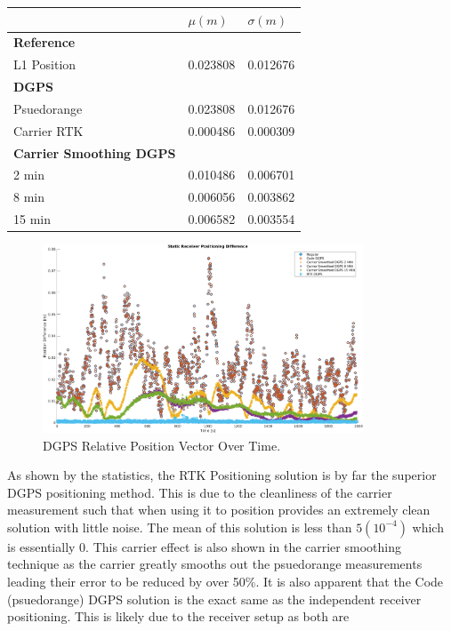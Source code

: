 \documentclass[11pt]{article}
\begin{document}
\begin{enumerate}[label=\textbf{\arabic*.}]
\begin{table}[H]
\begin{tabular}{ P{5cm}|P{3cm} P{3cm} }
         & \boldmath$\mu (m)$ & \boldmath$\sigma (m)$ \\
         \hline
         \textbf{Reference} &  \\
         L1 Position & 0.023808 & 0.012676 \\
         \hline
         \textbf{DGPS} &  \\
         Psuedorange & 0.023808 & 0.012676 \\
         Carrier RTK & 0.000486 & 0.000309 \\
         \hline
         \textbf{Carrier Smoothing DGPS} &  \\
         2 min & 0.010486 & 0.006701 \\
         8 min & 0.006056 & 0.003862 \\
         15 min & 0.006582 & 0.003554
      \end{tabular}
    \end{table}
    \begin{figure}[H]
      \centering
      \includegraphics[width=0.85\textwidth]{p2_comp.png}
      \caption{DGPS Relative Position Vector Over Time.}
    \end{figure}
    As shown by the statistics, the RTK Positioning solution is by far the superior DGPS 
    positioning method. This is due to the cleanliness of the carrier measurement such that 
    when using it to position provides an extremely clean solution with little noise. The 
    mean of this solution is less than $5(10^{-4})$ which is essentially $0$. This carrier 
    effect is also shown in the carrier smoothing technique as the carrier greatly smooths 
    out the psuedorange measurements leading their error to be reduced by over 50\%. It is 
    also apparent that the Code (psuedorange) DGPS solution is the exact same as the 
    independent receiver positioning. This is likely due to the receiver setup as both are 

\end{enumerate}
\end{document}
